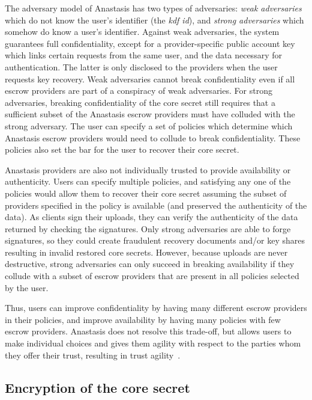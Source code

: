 The adversary model of Anastasis has two types of adversaries: {\em
  weak adversaries} which do not know the user’s identifier (the {\em
  kdf id}), and {\em strong adversaries} which somehow do know a
user’s identifier. Against weak adversaries, the system guarantees
full confidentiality, except for a provider-specific public account
key which links certain requests from the same user, and the data necessary
for authentication. The latter is only disclosed to the providers when
the user requests key recovery. Weak adversaries cannot break
confidentiality even if all escrow providers are part of a conspiracy
of weak adversaries.  For strong adversaries, breaking confidentiality
of the core secret still requires that a sufficient subset of the
Anastasis escrow providers must have colluded with the strong
adversary. The user can specify a set of policies which determine
which Anastasis escrow providers would need to collude to break
confidentiality. These policies also set the bar for the user to
recover their core secret.

Anastasis providers are also not individually trusted to provide
availability or authenticity. Users can specify multiple policies, and
satisfying any one of the policies would allow them to recover their
core secret assuming the subset of providers specified in the policy
is available (and preserved the authenticity of the data).  As clients
sign their uploads, they can verify the authenticity of the data
returned by checking the signatures.  Only strong adversaries are able
to forge signatures, so they could create fraudulent recovery
documents and/or key shares resulting in invalid restored core
secrets. However, because uploads are never destructive, strong
adversaries can only succeed in breaking availability if they collude
with a subset of escrow providers that are present in all policies
selected by the user.

Thus, users can improve confidentiality by having many different
escrow providers in their policies, and improve availability by having
many policies with few escrow providers. Anastasis does not resolve
this trade-off, but allows users to make individual choices and gives
them agility with respect to the parties whom they offer their
trust, resulting in trust agility~\cite{marlinspike2011}.


\subsection{Encryption of the core secret}

